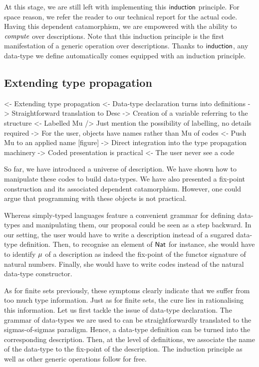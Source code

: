 At this stage, we are still left with implementing this
$\F{induction}$ principle. For space reason, we refer the reader to
our technical report for the actual code. Having this dependent
catamorphism, we are empowered with the ability to $\emph{compute}$
over descriptions. Note that this induction principle is the first
manifestation of a generic operation over descriptions. Thanks to
$\F{induction}$, any data-type we define automatically comes equipped
with an induction principle.


\subsection{Extending type propagation}

\begin{wstructure}
<- Extending type propagation
    <- Data-type declaration turns into definitions
        -> Straightforward translation to Desc
        -> Creation of a variable referring to the structure
    <- Labelled Mu
        /> Just mention the possibility of labelling, no details required
        -> For the user, objects have names rather than Mu of codes
    <- Push Mu to an applied name [figure]
        -> Direct integration into the type propagation machinery
    -> Coded presentation is practical
        <- The user never see a code
\end{wstructure}


So far, we have introduced a universe of description. We have shown
how to manipulate these codes to build data-types. We have also
presented a fix-point construction and its associated dependent
catamorphism. However, one could argue that programming with these
objects is not practical.

Whereas simply-typed languages feature a convenient grammar for
defining data-types and manipulating them, our proposal could be seen
as a step backward. In our setting, the user would have to write a
description instead of a sugared data-type definition. Then, to
recognise an element of $\Nat$ for instance, she would have to
identify $\Mu{}$ of a description as indeed the fix-point of the
functor signature of natural numbers. Finally, she would have to write
codes instead of the natural data-type constructor.

As for finite sets previously, these symptoms clearly indicate that we
suffer from too much type information. Just as for finite sets, the
cure lies in rationalising this information. Let us first tackle the
issue of data-type declaration. The grammar of data-types we are used
to can be straightforwardly translated to the sigmas-of-sigmas
paradigm. Hence, a data-type definition can be turned into the
corresponding description. Then, at the level of definitions, we
associate the name of the data-type to the fix-point of the
description. The induction principle as well as other generic
operations follow for free.

